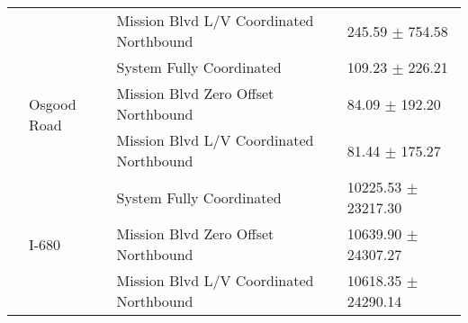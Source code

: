 \begin{tabular}{llll}
 &  & Mission Blvd L/V Coordinated Northbound & 245.59 $\pm$ 754.58 \\
 & \multirow[t]{3}{*}{Osgood Road} & System Fully Coordinated & 109.23 $\pm$ 226.21 \\
 &  & Mission Blvd Zero Offset Northbound & 84.09 $\pm$ 192.20 \\
 &  & Mission Blvd L/V Coordinated Northbound & 81.44 $\pm$ 175.27 \\
 & \multirow[t]{3}{*}{I-680} & System Fully Coordinated & 10225.53 $\pm$ 23217.30 \\
 &  & Mission Blvd Zero Offset Northbound & 10639.90 $\pm$ 24307.27 \\
 &  & Mission Blvd L/V Coordinated Northbound & 10618.35 $\pm$ 24290.14 \\
\bottomrule
\end{tabular}
